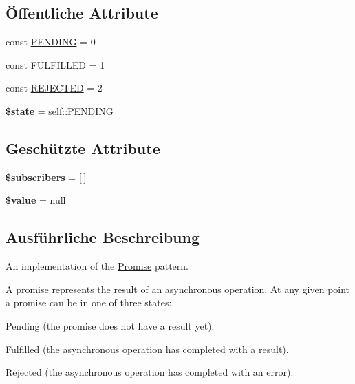 \subsection*{Öffentliche Attribute}
\begin{DoxyCompactItemize}
\item 
const \mbox{\hyperlink{class_sabre_1_1_event_1_1_promise_aa7609f4a75ccc2d8ffff06cb4bb450da}{P\+E\+N\+D\+I\+NG}} = 0
\item 
const \mbox{\hyperlink{class_sabre_1_1_event_1_1_promise_a90e3fd8afeb4ed2598f0a061476cc834}{F\+U\+L\+F\+I\+L\+L\+ED}} = 1
\item 
const \mbox{\hyperlink{class_sabre_1_1_event_1_1_promise_abdcac79da741ea6b4ac3d5c605e58b99}{R\+E\+J\+E\+C\+T\+ED}} = 2
\item 
\mbox{\label{class_sabre_1_1_event_1_1_promise_a8a7c668f7eb47419da76d14762979b0a}} 
{\bfseries \$state} = self\+::\+P\+E\+N\+D\+I\+NG
\end{DoxyCompactItemize}
\subsection*{Geschützte Attribute}
\begin{DoxyCompactItemize}
\item 
\mbox{\label{class_sabre_1_1_event_1_1_promise_a12080be8387cf13bbe7d7360d878a4fe}} 
{\bfseries \$subscribers} = \mbox{[}$\,$\mbox{]}
\item 
\mbox{\label{class_sabre_1_1_event_1_1_promise_a432a94999a5b9b37517cda3c35634761}} 
{\bfseries \$value} = null
\end{DoxyCompactItemize}


\subsection{Ausführliche Beschreibung}
An implementation of the \mbox{\hyperlink{class_sabre_1_1_event_1_1_promise}{Promise}} pattern.

A promise represents the result of an asynchronous operation. At any given point a promise can be in one of three states\+:


\begin{DoxyEnumerate}
\item Pending (the promise does not have a result yet).
\item Fulfilled (the asynchronous operation has completed with a result).
\item Rejected (the asynchronous operation has completed with an error).
\end{DoxyEnumerate}

